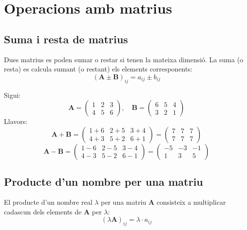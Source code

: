 \documentclass[12pt]{article}
\newcommand{\mat}[1]{\mathbf{#1}}
\begin{document}
\section{Operacions amb matrius}

\subsection{Suma i resta de matrius}
\begin{concept}
Dues matrius es poden sumar o restar si tenen la mateixa dimensió. La suma (o resta) es calcula sumant (o restant) els elements corresponents:
\[
(\mat{A} \pm \mat{B})_{ij} = a_{ij} \pm b_{ij}
\]
\end{concept}

\begin{exemple}
Sigui:
\[
\mat{A} = \begin{pmatrix}
1 & 2 & 3 \\
4 & 5 & 6
\end{pmatrix}, \quad
\mat{B} = \begin{pmatrix}
6 & 5 & 4 \\
3 & 2 & 1
\end{pmatrix}
\]
Llavors:
\[
\mat{A} + \mat{B} = \begin{pmatrix}
1+6 & 2+5 & 3+4 \\
4+3 & 5+2 & 6+1
\end{pmatrix} =
\begin{pmatrix}
7 & 7 & 7 \\
7 & 7 & 7
\end{pmatrix}
\]
\[
\mat{A} - \mat{B} = \begin{pmatrix}
1-6 & 2-5 & 3-4 \\
4-3 & 5-2 & 6-1
\end{pmatrix} =
\begin{pmatrix}
-5 & -3 & -1 \\
1 & 3 & 5
\end{pmatrix}
\]
\end{exemple}

\subsection{Producte d'un nombre per una matriu}
\begin{concept}
El producte d'un nombre real $\lambda$ per una matriu $\mat{A}$ consisteix a multiplicar cadascun dels elements de $\mat{A}$ per $\lambda$:
\[
(\lambda \mat{A})_{ij} = \lambda \cdot a_{ij}
\]
\end{concept}
\end{document}

